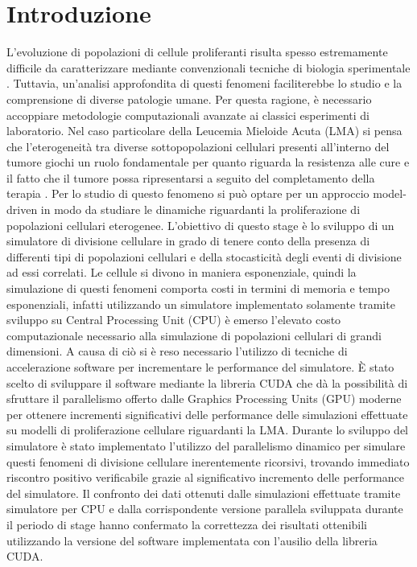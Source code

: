 
\chapter{Introduzione} %

\label{Introduzione} %



L’evoluzione di popolazioni di cellule proliferanti risulta spesso estremamente
difficile da caratterizzare mediante convenzionali tecniche di biologia
sperimentale \cite{aml2018unimib}. Tuttavia, un’analisi approfondita di questi fenomeni
faciliterebbe lo studio e la comprensione di diverse patologie umane.
Per questa ragione, è necessario accoppiare metodologie computazionali 
avanzate ai classici esperimenti di laboratorio. Nel caso particolare della 
Leucemia Mieloide Acuta (LMA) si pensa che l'eterogeneità tra diverse 
sottopopolazioni cellulari presenti all'interno del tumore giochi un ruolo 
fondamentale per quanto riguarda la resistenza alle cure e il fatto che il 
tumore possa ripresentarsi a seguito del completamento della terapia \cite{aml2018unimib}.
Per lo studio di questo fenomeno si può optare per un approccio model-driven 
in modo da studiare le dinamiche riguardanti la proliferazione di 
popolazioni cellulari eterogenee\cite{aml2018unimib}. 
L'obiettivo di questo stage è lo sviluppo di un 
simulatore di divisione cellulare in grado di tenere conto della presenza 
di differenti tipi di popolazioni cellulari e della stocasticità degli eventi
di divisione ad essi correlati. Le cellule si divono in maniera esponenziale, 
quindi la simulazione di questi fenomeni comporta costi in termini di memoria 
e tempo esponenziali, infatti utilizzando un simulatore implementato 
solamente tramite sviluppo su Central Processing Unit (CPU) 
è emerso l'elevato costo 
computazionale necessario alla simulazione di popolazioni cellulari di grandi 
dimensioni. A causa di ciò si è reso necessario 
l'utilizzo di tecniche di accelerazione software per incrementare le 
performance del simulatore. È stato scelto di sviluppare il software 
mediante la libreria CUDA che dà la possibilità di sfruttare il parallelismo 
offerto dalle Graphics Processing Units (GPU) moderne per ottenere incrementi 
significativi delle performance delle simulazioni effettuate su modelli di 
proliferazione cellulare riguardanti la LMA.
Durante lo sviluppo del simulatore è stato implementato l'utilizzo del 
parallelismo dinamico per simulare questi fenomeni 
di divisione cellulare inerentemente ricorsivi, trovando immediato riscontro 
positivo verificabile grazie al significativo incremento delle performance 
del simulatore. Il confronto dei dati ottenuti dalle simulazioni effettuate
tramite simulatore per CPU e dalla corrispondente versione parallela 
sviluppata durante il periodo di stage hanno confermato la correttezza dei
risultati ottenibili utilizzando la versione del software implementata con
l'ausilio della libreria CUDA.
